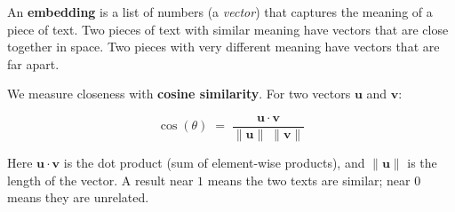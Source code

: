 \documentclass[a4paper,11pt]{article}
\newcommand{\vocab}[1]{\textbf{\color{navy}#1}}
\begin{document}
An \vocab{embedding} is a list of numbers (a \emph{vector}) that captures the meaning
of a piece of text.
Two pieces of text with similar meaning have vectors that are close together in space.
Two pieces with very different meaning have vectors that are far apart.

We measure closeness with \vocab{cosine similarity}.
For two vectors $\mathbf{u}$ and $\mathbf{v}$:

\begin{equation}
  \cos(\theta) \;=\; \frac{\mathbf{u} \cdot \mathbf{v}}{\|\mathbf{u}\| \;\|\mathbf{v}\|}
\end{equation}

Here $\mathbf{u} \cdot \mathbf{v}$ is the dot product (sum of element-wise products),
and $\|\mathbf{u}\|$ is the length of the vector.
A result near $1$ means the two texts are similar; near $0$ means they are unrelated.
\end{document}
